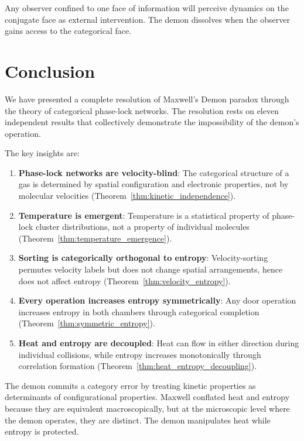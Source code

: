 \documentclass[twocolumn,showpacs,preprintnumbers,amsmath,amssymb,prd]{revtex4-2}
\theoremstyle{definition}
\theoremstyle{remark}
\begin{document}
Any observer confined to one face of information will perceive dynamics on the conjugate face as external intervention. The demon dissolves when the observer gains access to the categorical face.

\section{Conclusion}
\label{sec:conclusion}

We have presented a complete resolution of Maxwell's Demon paradox through the theory of categorical phase-lock networks. The resolution rests on eleven independent results that collectively demonstrate the impossibility of the demon's operation.

The key insights are:

\begin{enumerate}
\item \textbf{Phase-lock networks are velocity-blind}: The categorical structure of a gas is determined by spatial configuration and electronic properties, not by molecular velocities (Theorem~\ref{thm:kinetic_independence}).

\item \textbf{Temperature is emergent}: Temperature is a statistical property of phase-lock cluster distributions, not a property of individual molecules (Theorem~\ref{thm:temperature_emergence}).

\item \textbf{Sorting is categorically orthogonal to entropy}: Velocity-sorting permutes velocity labels but does not change spatial arrangements, hence does not affect entropy (Theorem~\ref{thm:velocity_entropy}).

\item \textbf{Every operation increases entropy symmetrically}: Any door operation increases entropy in both chambers through categorical completion (Theorem~\ref{thm:symmetric_entropy}).

\item \textbf{Heat and entropy are decoupled}: Heat can flow in either direction during individual collisions, while entropy increases monotonically through correlation formation (Theorem~\ref{thm:heat_entropy_decoupling}).
\end{enumerate}

The demon commits a category error by treating kinetic properties as determinants of configurational properties. Maxwell conflated heat and entropy because they are equivalent macroscopically, but at the microscopic level where the demon operates, they are distinct. The demon manipulates heat while entropy is protected.
\end{document}
